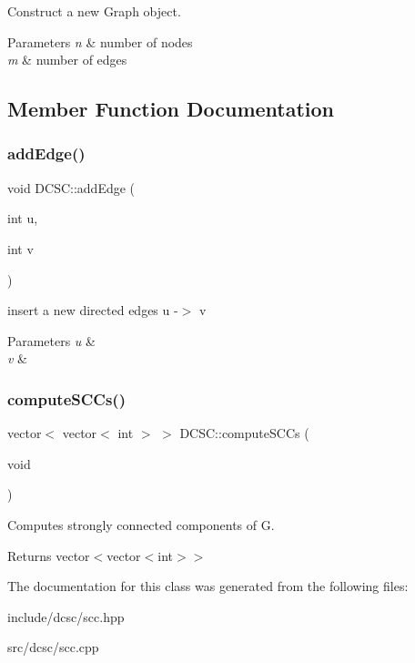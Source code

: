 Construct a new Graph object. 


\begin{DoxyParams}{Parameters}
{\em n} & number of nodes \\
\hline
{\em m} & number of edges \\
\hline
\end{DoxyParams}


\subsection{Member Function Documentation}
\mbox{\label{classDCSC_ac971c9c7f4b35eebaab12f9dc399e260}} 
\subsubsection{\texorpdfstring{add\+Edge()}{addEdge()}}
{\footnotesize\ttfamily void D\+C\+S\+C\+::add\+Edge (\begin{DoxyParamCaption}\item[{int}]{u,  }\item[{int}]{v }\end{DoxyParamCaption})}



insert a new directed edges u -\/$>$ v 


\begin{DoxyParams}{Parameters}
{\em u} & \\
\hline
{\em v} & \\
\hline
\end{DoxyParams}
\mbox{\label{classDCSC_a287ebcdb5c7588d274e0b9574af0451e}} 
\subsubsection{\texorpdfstring{compute\+S\+C\+Cs()}{computeSCCs()}}
{\footnotesize\ttfamily vector$<$ vector$<$ int $>$ $>$ D\+C\+S\+C\+::compute\+S\+C\+Cs (\begin{DoxyParamCaption}\item[{void}]{ }\end{DoxyParamCaption})}



Computes strongly connected components of G. 

\begin{DoxyReturn}{Returns}
vector$<$vector$<$int$>$$>$ 
\end{DoxyReturn}


The documentation for this class was generated from the following files\+:\begin{DoxyCompactItemize}
\item 
include/dcsc/scc.\+hpp\item 
src/dcsc/scc.\+cpp\end{DoxyCompactItemize}
